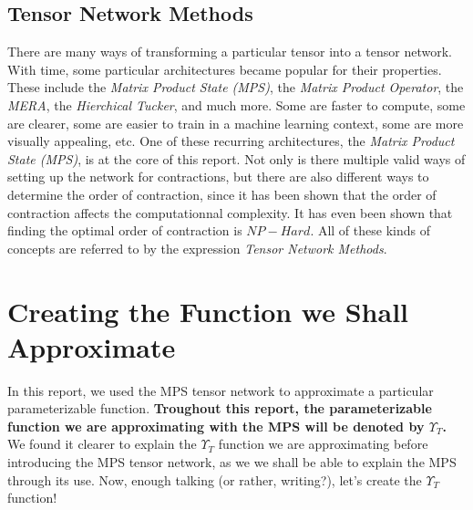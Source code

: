 \documentclass{article}
\theoremstyle{definition}
\theoremstyle{definition}
\begin{document}
\subsection{Tensor Network Methods}
There are many ways of transforming a particular tensor into a tensor network. 
With time, some particular architectures became popular for their properties. These include the \emph{\it Matrix Product State (MPS)}, the \emph{Matrix Product Operator}, the \emph{MERA}, the \emph{Hierchical Tucker}, and much more.
Some are faster to compute, some are clearer, some are easier to train in a machine learning context, some are more visually appealing, etc. One of these recurring architectures, the \emph{\it Matrix Product State (MPS)}, is at the core of this report.
Not only is there multiple valid ways of setting up the network for contractions, but there are also different ways to determine the order of contraction, since it has been shown that the order of contraction affects the computationnal complexity. It has even been shown that finding the optimal order of contraction is $NP-Hard$. All of these kinds of concepts are referred to by the expression \emph{Tensor Network Methods}. 

\section{Creating the Function we Shall Approximate}
In this report, we used the MPS tensor network to approximate a particular parameterizable function.
{\bf Troughout this report, the parameterizable function we are approximating with the MPS will be denoted by $\Upsilon_{T}$. }
We found it clearer to explain the $\Upsilon_{T}$ function we are approximating before introducing the MPS tensor network, as we we shall be able to explain the MPS through its use.
Now, enough talking (or rather, writing?), let's create the $\Upsilon_{T}$ function!
\end{document}
